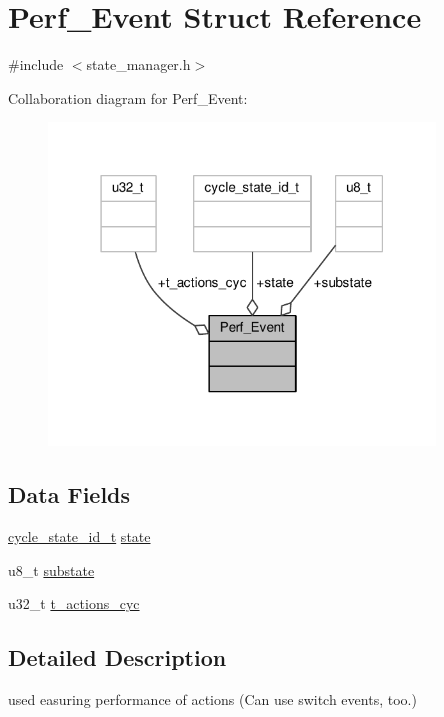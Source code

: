 \hypertarget{struct_perf___event}{}\section{Perf\+\_\+\+Event Struct Reference}
\label{struct_perf___event}


{\ttfamily \#include $<$state\+\_\+manager.\+h$>$}



Collaboration diagram for Perf\+\_\+\+Event\+:\nopagebreak
\begin{figure}[H]
\begin{center}
\leavevmode
\includegraphics[width=291pt]{struct_perf___event__coll__graph}
\end{center}
\end{figure}
\subsection*{Data Fields}
\begin{DoxyCompactItemize}
\item 
\hyperlink{states_8h_a9e0ef0bc98a491d55216d9485e562252}{cycle\+\_\+state\+\_\+id\+\_\+t} \hyperlink{struct_perf___event_a6ed5d93e163f36fafba6a6fa602ab3f0}{state}
\item 
u8\+\_\+t \hyperlink{struct_perf___event_aa719d2e676dc0eeaafeaae9bbc1849f0}{substate}
\item 
u32\+\_\+t \hyperlink{struct_perf___event_a19240b276493b0f29eb1495b8b03a644}{t\+\_\+actions\+\_\+cyc}
\end{DoxyCompactItemize}


\subsection{Detailed Description}
used easuring performance of actions (Can use switch events, too.) 

